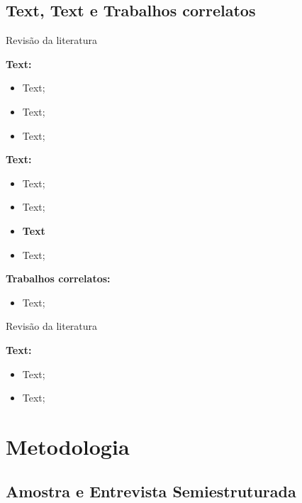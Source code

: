 \documentclass[8pt,aspectratio = 1610]{beamer}
\begin{document}
\subsection{Text, Text e Trabalhos correlatos}
\begin{frame}{Revisão da literatura}{}
\begin{block}{}

\textbf{Text:}
    \begin{itemize}
         \item Text;
         \item Text;
         \item Text;
    \end{itemize} 
 \vspace{5pt} 
\textbf{Text:}
    \begin{itemize}
         \item Text;
         \item Text;
         \item \textbf{Text} 
         \item Text;
    \end{itemize}
     \vspace{5pt} 
 \textbf{Trabalhos correlatos:}
    \begin{itemize}
         \item Text;
    \end{itemize}

\end{block}
\end{frame}

\begin{frame}{Revisão da literatura}{}
\begin{block}{}
\textbf{Text:}
 \begin{itemize}
     \item Text;
     \item Text;
 \end{itemize}
 

\end{block}
\end{frame}

\section{Metodologia}
\subsection{Amostra e Entrevista Semiestruturada}
\end{document}
